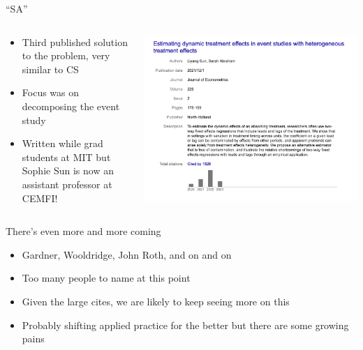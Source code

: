 \documentclass{beamer}
\begin{document}
\begin{frame}{``SA''}
  \begin{columns}
    \begin{column}{0.5\textwidth}
      \begin{itemize}
\item Third published solution to the problem, very similar to CS
\item Focus was on decomposing the event study
\item Written while grad students at MIT but Sophie Sun is now an assistant professor at CEMFI!
      \end{itemize}
    \end{column}
    \begin{column}{0.5\textwidth}
      \includegraphics[scale=0.25]{./lecture_includes/sun_cites}
    \end{column}
  \end{columns}
\end{frame}

\begin{frame}{There's even more and more coming}

\begin{itemize}
\item Gardner, Wooldridge, John Roth, and on and on
\item Too many people to name at this point
\item Given the large cites, we are likely to keep seeing more on this
\item Probably shifting applied practice for the better but there are some growing pains
\end{itemize}

\end{frame}
\end{document}
